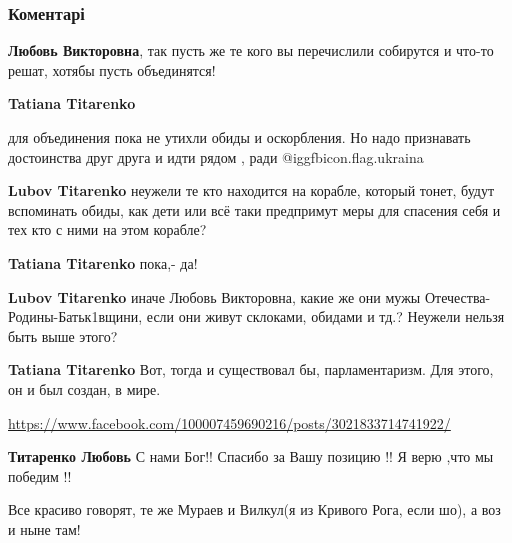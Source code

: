  
 
 
 
 
\subsubsection{Коментарі}

\begin{itemize} %
\textbf{Любовь Викторовна}, так пусть же те кого вы перечислили собирутся и что-то решат, хотябы пусть объединятся!

\begin{itemize} %
\textbf{Tatiana Titarenko} 

для объединения пока не утихли обиды и оскорбления. Но надо признавать
достоинства друг друга и идти рядом , ради @igg{fbicon.flag.ukraina}


\textbf{Lubov Titarenko} неужели те кто находится на корабле, который тонет, будут вспоминать обиды, как дети или всё таки предпримут меры для спасения себя и тех кто с ними на этом корабле?

\textbf{Tatiana Titarenko} пока,- да!

\textbf{Lubov Titarenko} иначе Любовь Викторовна, какие же они мужы Отечества-Родины-Батьк1вщини, если они живут склоками, обидами и тд.? Неужели нельзя быть выше этого?

\textbf{Tatiana Titarenko} Вот, тогда и существовал бы, парламентаризм. Для этого, он и был создан, в мире.
\end{itemize} %

\url{https://www.facebook.com/100007459690216/posts/3021833714741922/}

\begin{itemize} %
\textbf{Титаренко Любовь} С нами Бог!! Спасибо за Вашу позицию !! Я верю ,что мы победим !!
\end{itemize} %

Все красиво говорят, те же Мураев и Вилкул(я из Кривого Рога, если шо), а воз и ныне там!


\end{itemize}
